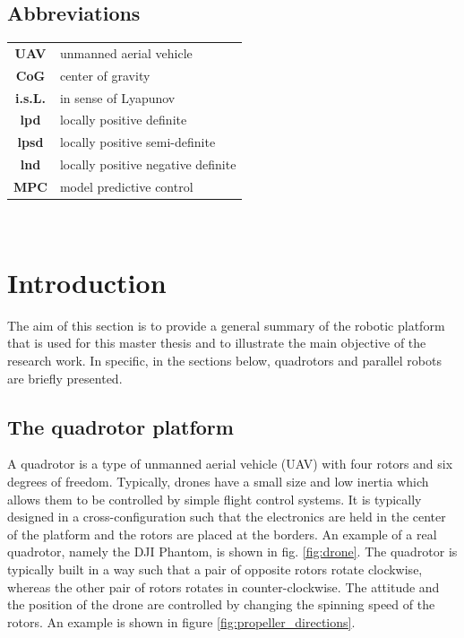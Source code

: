\documentclass{thesisreport}
\begin{document}
 
 
 \newpage
 
  \section*{Abbreviations}
 \begin{tabular}{cp{}}
  \textbf{UAV} & unmanned aerial vehicle \\
  \textbf{CoG} & center of gravity \\
  \textbf{i.s.L.} & in sense of Lyapunov \\
  \textbf{lpd} & locally positive definite \\
  \textbf{lpsd} & locally positive semi-definite \\
  \textbf{lnd} & locally positive negative definite \\
  \textbf{MPC} & model predictive control \\
\end{tabular}\\
 \newpage
 
 \listoffigures
 
\listoftables
 
 \tableofcontents
 
 
 \chapter*{Introduction}
 	The aim of this section is to provide a general summary of the robotic platform that is used for this master thesis and to illustrate the main objective of the research work.
In specific, in the sections below, quadrotors and parallel robots are briefly presented.


 
 
 \section*{The quadrotor platform}

A quadrotor is a type of unmanned aerial vehicle (UAV) with four rotors and six degrees of freedom. Typically, drones have a small size and low inertia which allows them to be controlled by simple flight control systems. It is typically designed in a cross-configuration such that the electronics are held in the center of the platform and the rotors are placed at the borders.
An example of a real quadrotor, namely the DJI Phantom, is shown in fig. \ref{fig:drone}. The quadrotor is typically built in a way such that a pair of opposite rotors rotate clockwise, whereas the other pair of rotors rotates in counter-clockwise.
The attitude and the position of the drone are controlled by changing the spinning speed of the rotors. An example is shown in figure \ref{fig:propeller_directions}.
\end{document}
